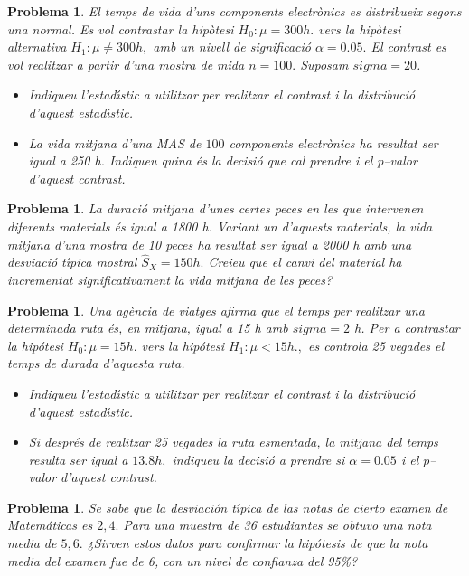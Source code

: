 \documentclass[11pt]{article}
\newcounter{prbcont}
\newtheorem{problema}[prbcont]{Problema}
\begin{document}
\begin{problema}
El temps de vida d'uns components electr\`onics es distribueix segons una normal.
Es vol contrastar la hip\`otesi $H_0 : \mu = 300 h.$ vers la hip\`otesi alternativa
$H_1 : \mu \neq 300 h,$ amb un nivell de significaci\'o $\alpha = 0.05.$ El contrast es vol realitzar a partir d'una mostra de mida $n = 100.$
Suposam $sigma=20$.
\begin{itemize}
\item [(a)] Indiqueu l'estad\'{\i}stic a utilitzar per realitzar el contrast i la distribuci\'o d'aquest estad\'{\i}stic.
\item [(b)] La vida mitjana d'una MAS de $100$ components electr\`onics ha resultat ser igual
a 250 h. Indiqueu quina \'es la decisi\'o que cal prendre i el p--valor d'aquest
contrast. %
\end{itemize}
\end{problema}

\begin{problema}
La duraci\'o mitjana d'unes certes peces en les que intervenen diferents materials \'es
igual a 1800 h. Variant un d'aquests materials, la vida mitjana d'una mostra de 10
peces ha resultat ser igual a 2000 h amb una desviaci\'o t\'{\i}pica mostral $\hat{S}_X = 150 h.$
Creieu que el canvi del material ha incrementat significativament la vida mitjana de
les peces? %
\end{problema}

\begin{problema}
Una ag\`encia de viatges afirma que el temps per realitzar una determinada ruta \'es, en
mitjana, igual a 15 h amb $sigma = 2$ h. Per a contrastar la hip\'otesi $H_0 : \mu = 15 h.$ vers
la hip\'otesi $H_1 : \mu < 15 h.,$ es controla 25 vegades el temps de durada d'aquesta ruta.
\begin{itemize}
\item [(a)] Indiqueu l'estad\'{\i}stic a utilitzar per realitzar el contrast i la distribuci\'o d'aquest estad\'{\i}stic.
\item [(b)] Si despr\'es de realitzar 25 vegades la ruta esmentada, la mitjana del temps resulta
ser igual a $13.8 h,$ indiqueu la decisi\'o a prendre si $\alpha=0.05$ i el $p$--valor d'aquest contrast.
\end{itemize}
\end{problema}

\begin{problema}
Se sabe que la desviaci\'on t\'{\i}pica de las notas de cierto examen de Matem\'aticas es $2,4.$ Para una muestra de 36 estudiantes se obtuvo una nota media de $5,6.$ ¿Sirven estos datos para confirmar la hip\'otesis de que la nota media del examen fue de 6, con un nivel de confianza del 95\%?
\end{problema}
\end{document}
